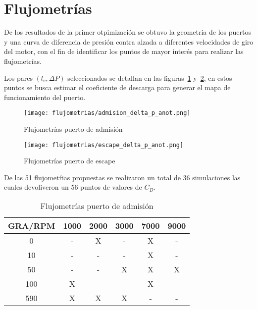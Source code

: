 \section{Flujometrías}

De los resultados de la primer otpimización se obtuvo la geometria de los
puertos y una curva de diferencia de presión contra alzada a diferentes
velocidades de giro del motor, con el fin de identificar los puntos de mayor
interés para realizar las flujometrías.


Los pares $(l_{v}, \Delta P)$ seleccionados se detallan en las
figuras~\ref{fig:delta_p_admision} y~\ref{fig:delta_p_escape}, en estos puntos
se busca estimar el coeficiente de descarga para generar el mapa de
funcionamiento del puerto.

\begin{figure}[h]
  \centering
  \texttt{[image: flujometrias/admision\_delta\_p\_anot.png]}
  \caption{Flujometrías puerto de admisión}\label{fig:delta_p_admision}
\end{figure}

\begin{figure}[h]
  \centering
  \texttt{[image: flujometrias/escape\_delta\_p\_anot.png]}
  \caption{Flujometrías puerto de escape}\label{fig:delta_p_escape}
\end{figure}

De las 51 flujometŕias propuestas se realizaron un total de 36 simulaciones las
cuales devoliveron un 56 puntos de valores de $C_{D}$.

\begin{table}[ht]
  \centering
  \begin{tabular}{cccccc}\toprule
    GRA/RPM & 1000 & 2000 & 3000 & 7000 & 9000 \\ \midrule
    0       & -    & X    & -    & X    & - \\
    10      & -    & -    & -    & X    & - \\
    50      & -    & -    & X    & X    & X \\
    100     & X    & -    & -    & X    & - \\
    590     & X    & X    & X    & -    & - \\ \bottomrule
  \end{tabular}
  \caption{Flujometrías puerto de admisión}\label{tab:flujometrias_admision}
\end{table}


